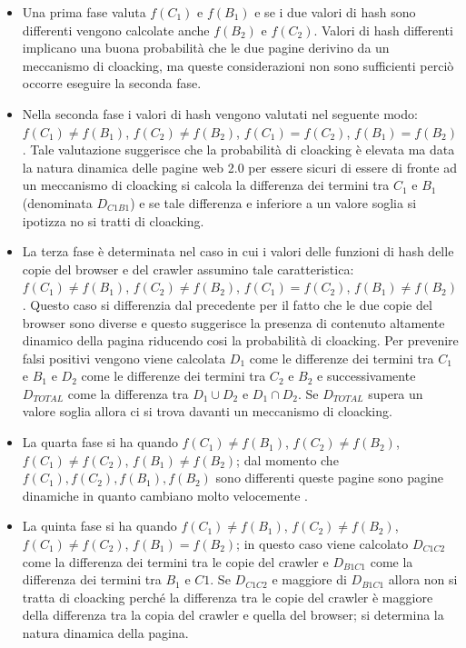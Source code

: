 \begin{itemize}
 \item Una prima fase valuta \(f(C_1)\) e \(f(B_1)\) e se i due valori di hash sono differenti vengono calcolate anche \(f(B_2)\) e \(f(C_2)\). Valori di hash differenti implicano una buona probabilità che le due pagine derivino da un meccanismo di cloacking, ma queste considerazioni non sono sufficienti perciò occorre eseguire la seconda fase.
 
 \item Nella seconda fase i valori di hash vengono valutati nel seguente modo: \(f(C_1)\not =f(B_1)\), \(f(C_2)\not=f(B_2)\), \(f(C_1)=f(C_2)\), \(f(B_1)=f(B_2)\). Tale valutazione suggerisce che la probabilità di cloacking è elevata ma data la natura dinamica delle pagine web 2.0 per essere sicuri di essere di fronte ad un meccanismo di cloacking si calcola la differenza dei termini tra \(C_1\) e \(B_1\) (denominata \(D_{C1B1}\)) e se tale differenza e inferiore a un valore soglia si ipotizza no si tratti di cloacking.
 
 \item La terza fase è determinata  nel  caso in cui i valori delle funzioni di hash delle copie del browser e del crawler assumino tale caratteristica: \(f(C_1)\not=f(B_1)\), \(f(C_2)\not=f(B_2)\), \(f(C_1)=f(C_2)\), \(f(B_1)\not=f(B_2)\). Questo caso si differenzia dal precedente per il fatto che le due copie del browser sono diverse e questo suggerisce la presenza di contenuto altamente dinamico della pagina riducendo cosi la probabilità di cloacking. Per prevenire falsi positivi vengono viene calcolata \(D_1\) come le differenze dei termini tra \(C_1\) e \(B_1\) e \(D_2\) come le differenze dei termini tra \(C_2\) e \(B_2\) e successivamente \(D_{TOTAL}\) come la differenza tra \(D_1\cup D_2\) e \(D_1 \cap D_2\). Se \(D_{TOTAL}\) supera un valore soglia allora ci si trova davanti un meccanismo di cloacking.
 
 \item La quarta fase si ha quando \(f(C_1)\not=f(B_1)\), \(f(C_2)\not=f(B_2)\), \(f(C_1)\not=f(C_2)\), \(f(B_1)\not=f(B_2)\); dal momento che \(f(C_1),f(C_2),f(B_1),f(B_2)\) sono differenti queste pagine sono pagine dinamiche in quanto cambiano molto velocemente . 
 
 \item La quinta fase si ha quando \(f(C_1)\not=f(B_1)\), \(f(C_2)\not=f(B_2)\), \(f(C_1)\not=f(C_2)\), \(f(B_1)=f(B_2)\); in questo caso viene calcolato \(D_{C1C2}\) come la differenza dei termini tra le copie del crawler e \(D_{B1C1}\) come la differenza dei termini tra \(B_1\) e \(C1\). Se \(D_{C1C2}\) e maggiore di \(D_{B1C1}\) allora non si tratta di cloacking perché la differenza tra le copie del crawler è maggiore della differenza tra la copia del crawler e quella del browser; si determina la natura dinamica della pagina. 
\end{itemize}
